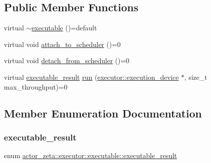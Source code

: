 \subsection*{Public Member Functions}
\begin{DoxyCompactItemize}
\item 
virtual \hyperlink{structactor__zeta_1_1executor_1_1executable_a12fbe24c0d826dbeae7ee3f9cae4ccf5}{$\sim$executable} ()=default
\item 
virtual void \hyperlink{structactor__zeta_1_1executor_1_1executable_a35557044e3f8d17504a66628aeea1cee}{attach\+\_\+to\+\_\+scheduler} ()=0
\item 
virtual void \hyperlink{structactor__zeta_1_1executor_1_1executable_a2fe91b45b919fc6f3fce21e64d2c1f91}{detach\+\_\+from\+\_\+scheduler} ()=0
\item 
virtual \hyperlink{structactor__zeta_1_1executor_1_1executable_aef06c63be7b22b021ade4b83ed4f3cc4}{executable\+\_\+result} \hyperlink{structactor__zeta_1_1executor_1_1executable_a61d6cbce8b124e1e5ef80f8befea2a89}{run} (\hyperlink{structactor__zeta_1_1executor_1_1execution__device}{executor\+::execution\+\_\+device} $\ast$, size\+\_\+t max\+\_\+throughput)=0
\end{DoxyCompactItemize}


\subsection{Member Enumeration Documentation}
\mbox{\label{structactor__zeta_1_1executor_1_1executable_aef06c63be7b22b021ade4b83ed4f3cc4}} 
\subsubsection{\texorpdfstring{executable\+\_\+result}{executable\_result}}
{\footnotesize\ttfamily enum \hyperlink{structactor__zeta_1_1executor_1_1executable_aef06c63be7b22b021ade4b83ed4f3cc4}{actor\+\_\+zeta\+::executor\+::executable\+::executable\+\_\+result}\hspace{0.3cm}{\ttfamily [strong]}}

